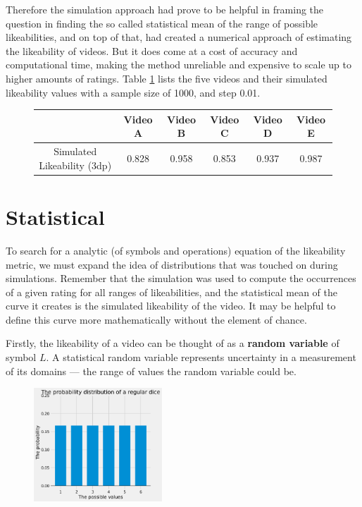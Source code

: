 \documentclass[a4paper,11pt]{article}
\begin{document}
Therefore the simulation approach had prove to be helpful in framing the question in finding the so called statistical mean of the range of possible likeabilities, and on top of that, had created a numerical approach of estimating the likeability of videos. But it does come at a cost of accuracy and computational time, making the method unreliable and expensive to scale up to higher amounts of ratings. Table \ref{tbl:simulation} lists the five videos and their simulated likeability values with a sample size of 1000, and step 0.01.

\begin{figure}[H]
    \centering
    \begin{tabular}{c|c|c|c|c|c}
        & Video A & Video B & Video C & Video D & Video E \\
        \hline
        \hline
        Simulated Likeability (3dp) & 0.828 & 0.958 &  0.853 & 0.937 & 0.987
    \end{tabular}
    \label{tbl:simulation}
\end{figure}

\section{Statistical}

To search for a analytic (of symbols and operations) equation of the likeability metric, we must expand the idea of distributions that was touched on during simulations. Remember that the simulation was used to compute the occurrences of a given rating for all ranges of likeabilities, and the statistical mean of the curve it creates is the simulated likeability of the video. It may be helpful to define this curve more mathematically without the element of chance.

Firstly, the likeability of a video can be thought of as a \textbf{random variable} of symbol $L$. A statistical random variable represents uncertainty in a measurement of its domains --- the range of values the random variable could be.

\begin{figure}
    \includegraphics[width=0.43\textwidth,right]{assets/discrete_uniform_pdfs.png}
    \caption{}
    \label{fig:discrete_uniform}
\end{figure}
\end{document}
